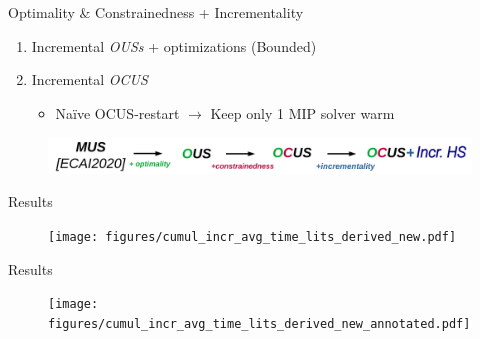 \documentclass{beamer}
\begin{document}
\begin{frame}{Optimality \& Constrainedness + Incrementality}
		\begin{enumerate}
			\item \color{vuborange} Incremental \emph{OUSs} + optimizations {\color{blue} (Bounded)}\pause
			\item {\color{vuborange} Incremental \emph{OCUS}}
			\begin{itemize}
				\item Naïve OCUS-restart $\rightarrow$ Keep only 1 MIP solver warm
			\end{itemize}
		\end{enumerate}
		\begin{figure}
			\includegraphics[width=\textwidth]{mus_to_ocus_i.png}
		\end{figure}
	\end{frame}


\begin{frame}{Results}
	\begin{figure}
		\texttt{[image: figures/cumul\_incr\_avg\_time\_lits\_derived\_new.pdf]}
	\end{figure}
\end{frame}

\begin{frame}{Results}
	\begin{figure}
		\texttt{[image: figures/cumul\_incr\_avg\_time\_lits\_derived\_new\_annotated.pdf]}
	\end{figure}
\end{frame}
	
\end{document}
